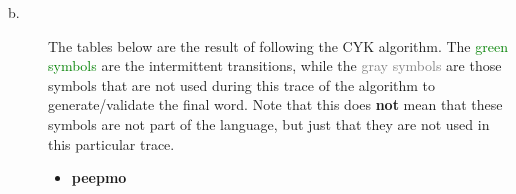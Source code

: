 \documentclass[11pt]{article}
\begin{document}
\begin{solution}
\begin{description}
\begin{itemize}


\end{itemize}

\item[b.] The tables below are the result of following the CYK algorithm. The \textcolor{Green}{green symbols} are the intermittent transitions, while the \textcolor{Gray}{gray symbols} are those symbols that are not used during this trace of the algorithm to generate/validate the final word. Note that this does \textbf{not} mean that these symbols are not part of the language, but just that they are not used in this particular trace.

\newpage

\begin{itemize}

    \item \textbf{peepmo} \\


\end{itemize}
\end{description}
\end{solution}
\end{document}

